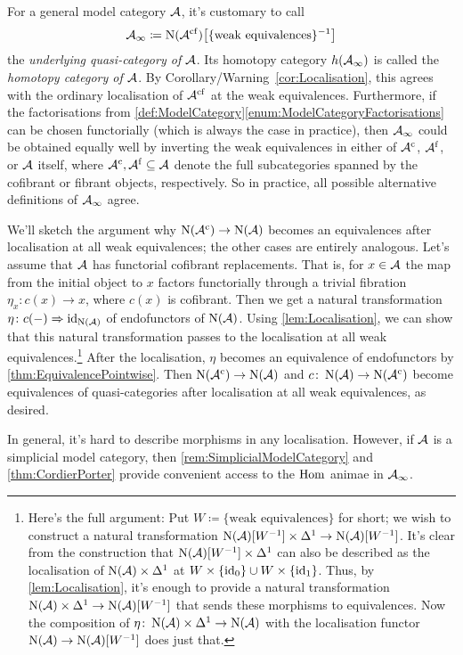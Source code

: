 \begin{rem}\label{rem:ModelCategoryUnderlyingInftyCategory}
	For a general model category $\mathcal{A}$, it's customary to call 
	\begin{equation*}
		\Aa_\infty\coloneqq \N(\Aa^\mathrm{cf})\left[\{\text{weak equivalences}\}^{-1}\right]
	\end{equation*}
	the \emph{underlying quasi-category of $\mathcal{A}$}. Its homotopy category $h(\mathcal{A}_\infty)$ is called the \emph{homotopy category of $\mathcal{A}$}. By Corollary/Warning~\cref{cor:Localisation}, this agrees with the ordinary localisation of $\mathcal{A}^\mathrm{cf}$ at the weak equivalences. Furthermore, if the factorisations from \cref{def:ModelCategory}\cref{enum:ModelCategoryFactorisations} can be chosen functorially (which is always the case in practice), then $\mathcal{A}_\infty$ could be obtained equally well by inverting the weak equivalences in either of $\mathcal{A}^\mathrm{c}$, $\mathcal{A}^\mathrm{f}$, or $\mathcal{A}$ itself, where $\mathcal{A}^\mathrm{c},\mathcal{A}^\mathrm{f}\subseteq \mathcal{A}$ denote the full subcategories spanned by the cofibrant or fibrant objects, respectively. So in practice, all possible alternative definitions of $\mathcal{A}_\infty$ agree. 
	
	We'll sketch the argument why $\operatorname{N}(\mathcal{A}^\mathrm{c})\rightarrow \operatorname{N}(\mathcal{A})$ becomes an equivalences after localisation at all weak equivalences; the other cases are entirely analogous. Let's assume that $\mathcal{A}$ has functorial cofibrant replacements. That is, for $x\in \mathcal{A}$ the map from the initial object to $x$ factors functorially through a trivial fibration $\eta_x\colon c(x)\rightarrow x$, where $c(x)$ is cofibrant. Then we get a natural transformation $\eta\colon c(-)\Rightarrow \operatorname{id}_{\operatorname{N}(\mathcal{A})}$ of endofunctors of $\operatorname{N}(\mathcal{A})$. Using \cref{lem:Localisation}, we can show that this natural transformation passes to the localisation at all weak equivalences.\footnote{Here's the full argument: Put $W\coloneqq\{\text{weak equivalences}\}$ for short; we wish to construct a natural transformation $\operatorname{N}(\mathcal{A})[W^{-1}]\times \Delta^1\rightarrow \operatorname{N}(\mathcal{A})[W^{-1}]$. It's clear from the construction that $\operatorname{N}(\mathcal{A})[W^{-1}]\times\Delta^1$ can also be described as the localisation of $\operatorname{N}(\mathcal{A})\times \Delta^1$ at $W\times\{\operatorname{id}_0\}\cup W\times\{\operatorname{id}_1\}$. Thus, by \cref{lem:Localisation}, it's enough to provide a natural transformation $\operatorname{N}(\mathcal{A})\times\Delta^1\rightarrow \operatorname{N}(\mathcal{A})[W^{-1}]$ that sends these morphisms to equivalences. Now the composition of $\eta\colon \operatorname{N}(\mathcal{A})\times\Delta^1\rightarrow \operatorname{N}(\mathcal{A})$ with the localisation functor $\operatorname{N}(\mathcal{A})\rightarrow \operatorname{N}(\mathcal{A})[W^{-1}]$ does just that.} After the localisation, $\eta$ becomes an equivalence of endofunctors by \cref{thm:EquivalencePointwise}. Then $\operatorname{N}(\mathcal{A}^\mathrm{c})\rightarrow \operatorname{N}(\mathcal{A})$ and $c\colon \operatorname{N}(\mathcal{A})\rightarrow \operatorname{N}(\mathcal{A}^\mathrm{c})$ become equivalences of quasi-categories after localisation at all weak equivalences, as desired. 
	
	
	
	
	In general, it's hard to describe morphisms in any localisation. However, if $\mathcal{A}$ is a simplicial model category, then \cref{rem:SimplicialModelCategory} and \cref{thm:CordierPorter} provide convenient access to the $\operatorname{Hom}$ animae in $\mathcal{A}_\infty$. 
\end{rem}



